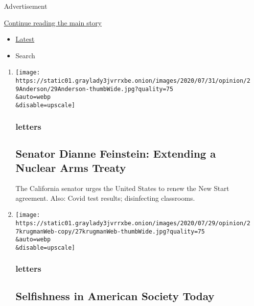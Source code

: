 Advertisement

\protect\hyperlink{after-mid1}{Continue reading the main story}

\begin{itemize}
\tightlist
\item
  \protect\hyperlink{stream-panel}{Latest}
\item
  Search
\end{itemize}

\begin{enumerate}
\def\labelenumi{\arabic{enumi}.}
\item
  \href{/2020/08/03/opinion/letters/nuclear-arms-treaty.html}{}

  \texttt{[image: https://static01.graylady3jvrrxbe.onion/images/2020/07/31/opinion/29Anderson/29Anderson-thumbWide.jpg?quality=75\\\&auto=webp\\\&disable=upscale]}

  \hypertarget{letters}{%
  \subsubsection{letters}\label{letters}}

  \hypertarget{senator-dianne-feinstein-extending-a-nuclear-arms-treaty}{%
  \subsection{Senator Dianne Feinstein: Extending a Nuclear Arms
  Treaty}\label{senator-dianne-feinstein-extending-a-nuclear-arms-treaty}}

  The California senator urges the United States to renew the New Start
  agreement. Also: Covid test results; disinfecting classrooms.
\item
  \href{/2020/08/03/opinion/letters/selfishness-society.html}{}

  \texttt{[image: https://static01.graylady3jvrrxbe.onion/images/2020/07/29/opinion/27krugmanWeb-copy/27krugmanWeb-thumbWide.jpg?quality=75\\\&auto=webp\\\&disable=upscale]}

  \hypertarget{letters-1}{%
  \subsubsection{letters}\label{letters-1}}

  \hypertarget{selfishness-in-american-society-today}{%
  \subsection{Selfishness in American Society
  Today}\label{selfishness-in-american-society-today}}


\end{enumerate}
